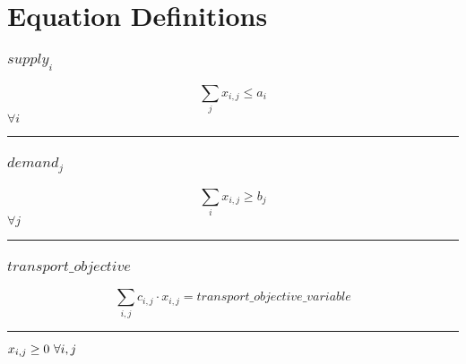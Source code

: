 \documentclass[11pt]{article}
\begin{document}
\section*{Equation Definitions}
\subsubsection*{$supply_{i}$}
\begin{equation}
\sum_{j} x_{i,j} \leq a_{i}
\end{equation}
\hfill
$
\forall i
$\vspace{5pt}
\hrule
\subsubsection*{$demand_{j}$}
\begin{equation}
\sum_{i} x_{i,j} \geq b_{j}
\end{equation}
\hfill
$
\forall j
$\vspace{5pt}
\hrule
\subsubsection*{$transport\_objective$}
\begin{equation}
\sum_{i,j} c_{i,j} \cdot x_{i,j} = transport\_objective\_variable
\end{equation}
\vspace{5pt}
\hrule
\bigskip
$x_{i,j}\geq 0 ~ \forall i,j\\$
\end{document}
